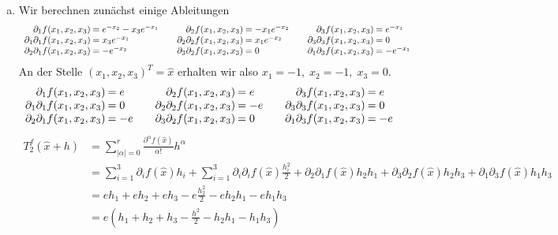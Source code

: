 \documentclass{article}
\theoremstyle{definition}
\begin{document}
\begin{enumerate}[(a)]
	\item Wir berechnen zunächst einige Ableitungen
	\[
		\begin{array}{rlcrlcrl}
			\partial_1f(x_1,x_2,x_3)\mkern-14mu&= e^{-x_2} -x_3e^{-x_1}&&
			\partial_2f(x_1,x_2,x_3)\mkern-14mu&= -x_1e^{-x_2}&&
			\partial_3f(x_1,x_2,x_3)\mkern-14mu&= e^{-x_1}\\
			\partial_1\partial_1f(x_1,x_2,x_3)\mkern-14mu&= x_3e^{-x_1}&&
			\partial_2\partial_2f(x_1,x_2,x_3)\mkern-14mu&= x_1e^{-x_2}&&
			\partial_3\partial_3f(x_1,x_2,x_3)\mkern-14mu&= 0\\
			\partial_2\partial_1f(x_1,x_2,x_3)\mkern-14mu&= -e^{-x_2}&&
			\partial_3\partial_2f(x_1,x_2,x_3)\mkern-14mu&= 0&&
			\partial_1\partial_3f(x_1,x_2,x_3)\mkern-14mu&= -e^{-x_1}
		\end{array}	
	\]
	An der Stelle $(x_1,x_2,x_3)^T = \hat x$ erhalten wir also $x_1 = -1,\;x_2=-1,\;x_3=0$.
	\[
		\begin{array}{rlcrlcrl}
			\partial_1f(x_1,x_2,x_3)\mkern-14mu&= e&&
			\partial_2f(x_1,x_2,x_3)\mkern-14mu&= e&&
			\partial_3f(x_1,x_2,x_3)\mkern-14mu&= e\\
			\partial_1\partial_1f(x_1,x_2,x_3)\mkern-14mu&= 0&&
			\partial_2\partial_2f(x_1,x_2,x_3)\mkern-14mu&= -e&&
			\partial_3\partial_3f(x_1,x_2,x_3)\mkern-14mu&= 0\\
			\partial_2\partial_1f(x_1,x_2,x_3)\mkern-14mu&= -e&&
			\partial_3\partial_2f(x_1,x_2,x_3)\mkern-14mu&= 0&&
			\partial_1\partial_3f(x_1,x_2,x_3)\mkern-14mu&= -e
		\end{array}	
	\]
	\begin{align*}
		T_2^f(\hat x + h) &= \sum_{|\alpha| = 0}^{r}\frac{\partial^{\alpha}f(\hat x)}{\alpha!}h^{\alpha}\\
		&= \sum_{i = 1}^{3} \partial_if(\hat x)h_i + \sum_{i = 1}^{3} \partial_i\partial_i f(\hat x) \frac{h_i^2}{2}  + \partial_2\partial_1f(\hat x) h_2h_1 +\partial_3\partial_2f(\hat x) h_2h_3 + \partial_1\partial_3f(\hat x) h_1h_3\\
		&= eh_1 + eh_2 + eh_3 -e\frac{h_2^2}{2} -eh_2h_1 -eh_1h_3\\
		&= e\left(h_1 + h_2 + h_3 - \frac{h^2}{2} - h_2h_1 - h_1h_3\right)
	\end{align*}
\end{enumerate}
\end{document}
